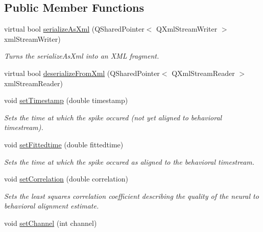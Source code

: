 \subsection*{Public Member Functions}
\begin{DoxyCompactItemize}
\item 
virtual bool \hyperlink{class_picto_1_1_neural_data_unit_af4974ade183a7b579a5f8166d5994301}{serialize\-As\-Xml} (Q\-Shared\-Pointer$<$ Q\-Xml\-Stream\-Writer $>$ xml\-Stream\-Writer)
\begin{DoxyCompactList}\small\item\em Turns the serialize\-As\-Xml into an X\-M\-L fragment. \end{DoxyCompactList}\item 
virtual bool \hyperlink{class_picto_1_1_neural_data_unit_a20e8df33e76f6f64d71a53b328c8011d}{deserialize\-From\-Xml} (Q\-Shared\-Pointer$<$ Q\-Xml\-Stream\-Reader $>$ xml\-Stream\-Reader)
\item 
\hypertarget{class_picto_1_1_neural_data_unit_a3476bf9ff1856f578286705093af8122}{void \hyperlink{class_picto_1_1_neural_data_unit_a3476bf9ff1856f578286705093af8122}{set\-Timestamp} (double timestamp)}\label{class_picto_1_1_neural_data_unit_a3476bf9ff1856f578286705093af8122}

\begin{DoxyCompactList}\small\item\em Sets the time at which the spike occured (not yet aligned to behavioral timestream). \end{DoxyCompactList}\item 
\hypertarget{class_picto_1_1_neural_data_unit_aae74ee04a2953d0aefeaa7ecb59a748a}{void \hyperlink{class_picto_1_1_neural_data_unit_aae74ee04a2953d0aefeaa7ecb59a748a}{set\-Fittedtime} (double fittedtime)}\label{class_picto_1_1_neural_data_unit_aae74ee04a2953d0aefeaa7ecb59a748a}

\begin{DoxyCompactList}\small\item\em Sets the time at which the spike occured as aligned to the behavioral timestream. \end{DoxyCompactList}\item 
\hypertarget{class_picto_1_1_neural_data_unit_a3be6b448d73158757befae9577f9fcd9}{void \hyperlink{class_picto_1_1_neural_data_unit_a3be6b448d73158757befae9577f9fcd9}{set\-Correlation} (double correlation)}\label{class_picto_1_1_neural_data_unit_a3be6b448d73158757befae9577f9fcd9}

\begin{DoxyCompactList}\small\item\em Sets the least squares correlation coefficient describing the quality of the neural to behavioral alignment estimate. \end{DoxyCompactList}\item 
\hypertarget{class_picto_1_1_neural_data_unit_ac351190afb99c4c8720f2560db1c4f13}{void \hyperlink{class_picto_1_1_neural_data_unit_ac351190afb99c4c8720f2560db1c4f13}{set\-Channel} (int channel)}\label{class_picto_1_1_neural_data_unit_ac351190afb99c4c8720f2560db1c4f13}


\end{DoxyCompactItemize}
